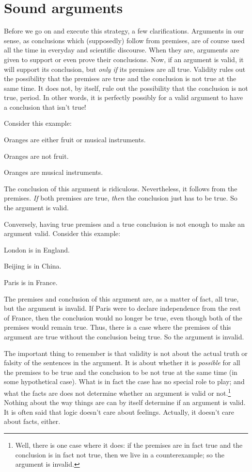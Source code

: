 \section{Sound arguments}

Before we go on and execute this strategy, a few clarifications. Arguments in our sense, as conclusions which (supposedly) follow from premises, are of course used all the time in everyday and scientific discourse. When they are, arguments are given to support or even prove their conclusions. Now, if an argument is valid, it will support its conclusion, but \emph{only if} its premises are all true. Validity rules out the possibility that the premises are true and the conclusion is not true at the same time. It does not, by itself, rule out the possibility that the conclusion is not true, period.  In other words, it is perfectly possibly for a valid argument to have a conclusion that isn't true!

Consider this example:
	\begin{earg}
		\item[] Oranges are either fruit or musical instruments.
		\item[] Oranges are not fruit.
		\item[\therefore] Oranges are musical instruments.
	\end{earg}
The conclusion of this argument is ridiculous. Nevertheless, it follows from the premises. \emph{If} both premises are true, \emph{then} the conclusion just has to be true. So the argument is valid.

Conversely, having true premises and a true conclusion is not enough to make an argument valid. Consider this example:
	\begin{earg}
		\item[] London is in England.
		\item[] Beijing is in China.
		\item[\therefore] Paris is in France.
	\end{earg}
The premises and conclusion of this argument are, as a matter of fact, all true, but the argument is invalid. If Paris were to declare independence from the rest of France, then the conclusion would no longer be true, even though both of the premises would remain true. Thus, there is a case where the premises of this argument are true without the conclusion being true. So the argument is invalid.

The important thing to remember is that validity is not about the actual truth or falsity of the sentences in the argument. It is about whether it is \emph{possible} for all the premises to be true and the conclusion to be not true at the same time (in some hypothetical case). What is in fact the case has no special role to play; and what the facts are does not determine whether an argument is valid or not.\footnote{Well, there is one case where it does: if the premises are in fact true and the conclusion is in fact not true, then we live in a counterexample; so the argument is invalid.} Nothing about the way things are can by itself determine if an argument is valid. It is often said that logic doesn't care about feelings. Actually, it doesn't care about facts, either.

